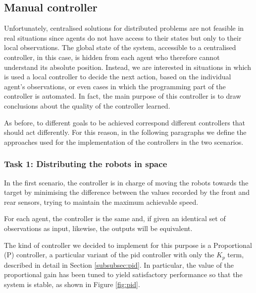 \subsection{Manual controller}
\label{subsec:manual}

Unfortunately, centralised solutions for distributed problems are not feasible in 
real situations since agents do not have access to their states but only to their local 
observations. The global state of the system, accessible to a centralised controller, 
in this case, is hidden from each agent who therefore cannot understand its 
absolute position.
Instead, we are interested in situations in which is used a local controller to decide 
the next action, based on the individual agent's observations, or even cases in 
which the programming part of the controller is automated.
In fact, the main purpose of this controller is to draw conclusions about the 
quality of the controller learned.

As before, to different goals to be achieved correspond different controllers 
that should act differently. For this reason, in the following paragraphs we define 
the approaches used for the implementation of the controllers in the two 
scenarios.

\subsubsection{Task 1: Distributing the robots in space}
\label{subsubsec:manualtask1}
In the first scenario, the controller is in charge of moving the robots towards the 
target by minimising the difference between the values recorded by the front and 
rear sensors, trying to maintain the maximum achievable speed.

For each agent, the controller is the same and, if given an identical set of 
observations as input, likewise, the outputs will be equivalent.

The kind of controller we decided to implement for this purpose is a Proportional 
(P) controller, a particular variant of the \gls{pid} controller with only the $K_p$ 
term, described in detail in Section \ref{subsubsec:pid}. 
In particular, the value of the proportional gain has been tuned to yield 
satisfactory performance so that the system is stable, as shown in Figure 
\ref{fig:pid}. 

